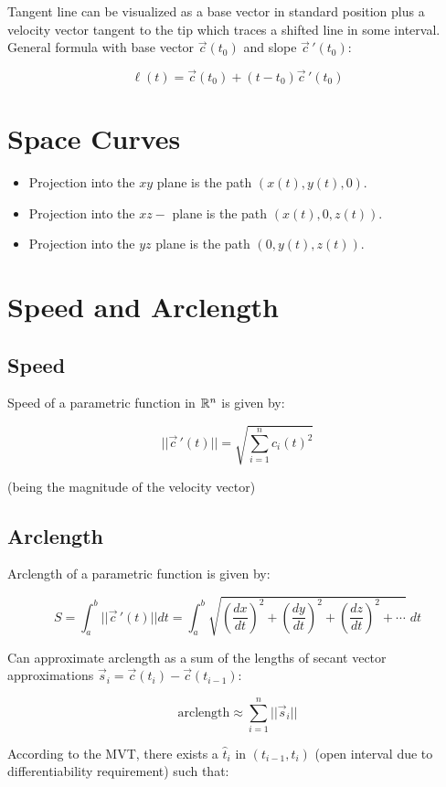 Tangent line can be visualized as a base vector in standard position plus a velocity vector
tangent to the tip which traces a shifted line in some interval. General formula with base vector $\vec{c}(t_0)$ and slope $\vec{c}\,'(t_0)$:

\[\boxed{\ell(t)=\vec{c}(t_0)+(t-t_0)\vec{c}\,'(t_0)}\]

\section{Space Curves}

\begin{itemize}
    \item Projection into the $x y$ plane is the path $(x(t), y(t), 0)$.
    \item Projection into the $x z-$ plane is the path $(x(t), 0, z(t))$.
    \item Projection into the $y z$ plane is the path $(0, y(t), z(t))$.
\end{itemize}

\section{Speed and Arclength}

\subsection{Speed}

Speed of a parametric function in $\mathbb{R}^n$ is given by:

$$||\vec{c}\,'(t)||=\sqrt{\displaystyle\sum_{i=1}^{n}c_i(t)^2}$$

(being the magnitude of the velocity vector)

\subsection{Arclength}

Arclength of a parametric function is given by:

\[S=\int_a^b ||\vec{c}\,'(t)||dt=\int_a^b\sqrt{(\frac{dx}{dt})^2+(\frac{dy}{dt})^2+(\frac{dz}{dt})^2+\cdots}\;dt\]

Can approximate arclength as a sum of the lengths of secant vector approximations
$\vec{s}_i=\vec{c}(t_i)-\vec{c}(t_{i-1})$:

\[\mbox{arclength}\approx\sum_{i=1}^n||\vec{s}_i||\]

According to the MVT, there exists a $\hat{t}_i$ in $(t_{i-1},t_i)$ (open interval due to differentiability requirement) such that:

